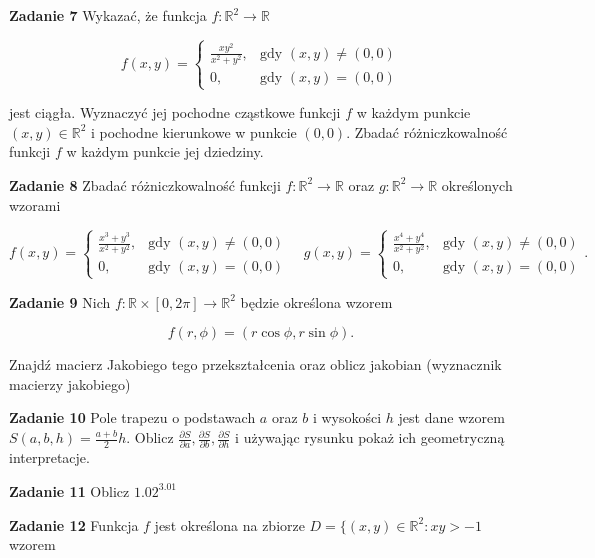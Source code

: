 \documentclass[a4paper,11pt]{article}
\newcommand{\RR}{\mathbb{R}}
\begin{document}
\bigskip

\textbf{Zadanie 7} Wykazać, że funkcja $f: \mathbb{R}^2 \to \mathbb{R}$

\[
f(x,y) =
\begin{cases}
    \frac{xy^2}{x^2 + y^2}, & \text{gdy~} (x,y) \neq (0,0) \\
    0, & \text{gdy~} (x,y) = (0,0)
\end{cases}
\] 

jest ciągła. Wyznaczyć jej pochodne cząstkowe funkcji $f$ w każdym punkcie
$(x, y) \in \mathbb{R}^2$ i pochodne kierunkowe w punkcie $(0, 0)$. Zbadać
różniczkowalność funkcji $f$ w każdym punkcie jej dziedziny.

\bigskip

\textbf{Zadanie 8} Zbadać różniczkowalność funkcji $f: \mathbb{R}^2 \to
\mathbb{R}$ oraz $g: \mathbb{R}^2 \to \mathbb{R}$ określonych wzorami

\[
f(x,y) = 
\begin{cases}
    \frac{x^3+y^3}{x^2+y^2}, & \text{gdy~} (x,y) \neq (0,0) \\
    0, & \text{gdy~} (x,y) = (0,0)
\end{cases}
\quad
g(x,y) =
\begin{cases}
    \frac{x^4+y^4}{x^2+y^2}, & \text{gdy~} (x,y) \neq (0,0) \\
    0, & \text{gdy~} (x,y) = (0,0)
\end{cases}
.\] 

\bigskip

\textbf{Zadanie 9} Nich $f: \mathbb{R} \times [0, 2\pi] \to \mathbb{R}^2$
będzie określona wzorem 

\[
f(r,\phi) = \left( r \cos\phi, r\sin \phi \right) 
.\] 

Znajdź macierz Jakobiego tego przekształcenia oraz oblicz jakobian
(wyznacznik macierzy jakobiego)

\bigskip

\textbf{Zadanie 10} Pole trapezu o podstawach $a$ oraz  $b$ i wysokości
$h$ jest dane wzorem {$S(a,b,h) = \frac{a+b}{2} h$}. Oblicz
$\frac{\partial S}{\partial a}, \frac{\partial S}{\partial b},
\frac{\partial S}{\partial h}$ i używając rysunku pokaż ich geometryczną
interpretacje.

\bigskip

\textbf{Zadanie 11} Oblicz $1.02^{3.01}$

\bigskip

\textbf{Zadanie 12} Funkcja $f$ jest określona na zbiorze $D = \{ (x,y)
    \in \RR^2: xy > -1$ wzorem 
\end{document}
